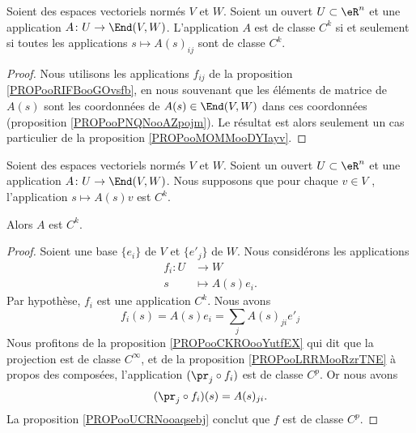 \begin{proposition}		\label{PROPooUCRNooaqsebj}
	Soient des espaces vectoriels normés \( V\) et \( W\). Soient un ouvert \( U\subset \eR^n\) et une application \(A \colon U\to \End(V,W)  \). L'application \( A\) est de classe \( C^k\) si et seulement si toutes les applications \( s\mapsto A(s)_{ij}\) sont de classe \( C^k\).
\end{proposition}

\begin{proof}
	Nous utilisons les applications \( f_{ij}\) de la proposition \ref{PROPooRIFBooGOvsfb}, en nous souvenant que les éléments de matrice de \( A(s)\) sont les coordonnées de \( A(s)\in\End(V,W)\) dans ces coordonnées (proposition \ref{PROPooPNQNooAZpojm}). Le résultat est alors seulement un cas particulier de la proposition \ref{PROPooMOMMooDYIayv}.
\end{proof}

\begin{proposition}		\label{PROPooYORGooDmwrJg}
	Soient des espaces vectoriels normés \( V\) et \( W\). Soient un ouvert \( U\subset \eR^n\) et une application \(A \colon U\to \End(V,W)  \). Nous supposons que pour chaque \( v\in V\) , l'application \( s\mapsto A(s)v\) est \( C^k\).

	Alors \( A\) est \( C^k\).
\end{proposition}

\begin{proof}
	Soient une base \( \{ e_i \}\) de \( V\) et \( \{ e'_j \}\) de \( W\). Nous considérons les applications
	\begin{equation}
		\begin{aligned}
			f_i\colon U & \to W            \\
			s           & \mapsto A(s)e_i.
		\end{aligned}
	\end{equation}
	Par hypothèse, \( f_i\) est une application \( C^k\). Nous avons
	\begin{equation}
		f_i(s)=A(s)e_i=\sum_jA(s)_{ji}e'_j
	\end{equation}
	Nous profitons de la proposition \ref{PROPooCKROooYutfEX} qui dit que la projection est de classe \( C^{\infty}\), et de la proposition \ref{PROPooLRRMooRzrTNE} à propos des composées, l'application \( (\pr_j\circ f_i)\) est de classe \( C^p\). Or nous avons
	\begin{equation}
		(\pr_j\circ f_i)(s)=A(s)_{ji}.
	\end{equation}
	La proposition \ref{PROPooUCRNooaqsebj} conclut que \( f\) est de classe \( C^p\).
\end{proof}

